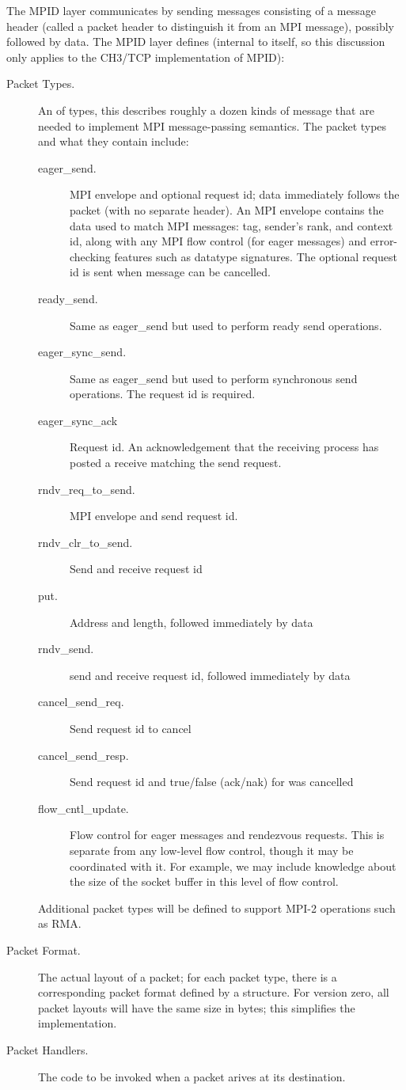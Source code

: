 \documentclass{article}
\begin{document}
The MPID layer communicates by sending messages consisting of a message header
(called a packet header to distinguish it from an MPI message), possibly
followed by data.  The MPID layer defines (internal to itself, so this
discussion only applies to the CH3/TCP implementation of MPID):
\begin{description}
\item[Packet Types.]An  of types, this describes roughly a
dozen kinds of 
  message that are needed to implement MPI message-passing semantics.  The
  packet types and what they contain include:
  \begin{description}
    \item[eager\_send.] MPI envelope and optional request id; data
      immediately follows the packet (with no separate header).  An
      MPI envelope contains the data used to match MPI messages: tag,
      sender's rank, and context id, along with any MPI flow control
      (for eager messages) and error-checking features such as
      datatype signatures.  The optional request id is sent when
      message can be cancelled.
    \item[ready\_send.] Same as eager\_send but used to perform ready
    send operations.
    \item[eager\_sync\_send.] Same as eager\_send but used to perform
    synchronous send operations.  The request id is required.
    \item[eager\_sync\_ack] Request id.  An acknowledgement that the
    receiving process has posted a receive matching the send request.
    \item[rndv\_req\_to\_send.]MPI envelope and send request id.
    \item[rndv\_clr\_to\_send.]Send and receive request id
    \item[put.]Address and length, followed immediately by data
    \item[rndv\_send.]send and receive request id, followed immediately by data
    \item[cancel\_send\_req.]Send request id to cancel
    \item[cancel\_send\_resp.]Send request id and true/false (ack/nak) for was
         cancelled
    \item[flow\_cntl\_update.]Flow control for eager messages and rendezvous
      requests.  This is separate from any low-level flow control, though it
      may be coordinated with it.  For example, we may include knowledge about
      the size of the socket buffer in this level of flow control.
    \end{description}
    Additional packet types will be defined to support MPI-2 operations such
    as RMA.
\item[Packet Format.]The actual layout of a packet; for each packet type, there
  is a corresponding packet format defined by a structure.  For version zero,
  all packet layouts will have the same size in bytes; this simplifies
  the implementation.
\item[Packet Handlers.]The code to be invoked when a packet arives at its
  destination. 
\end{description}
\end{document}
